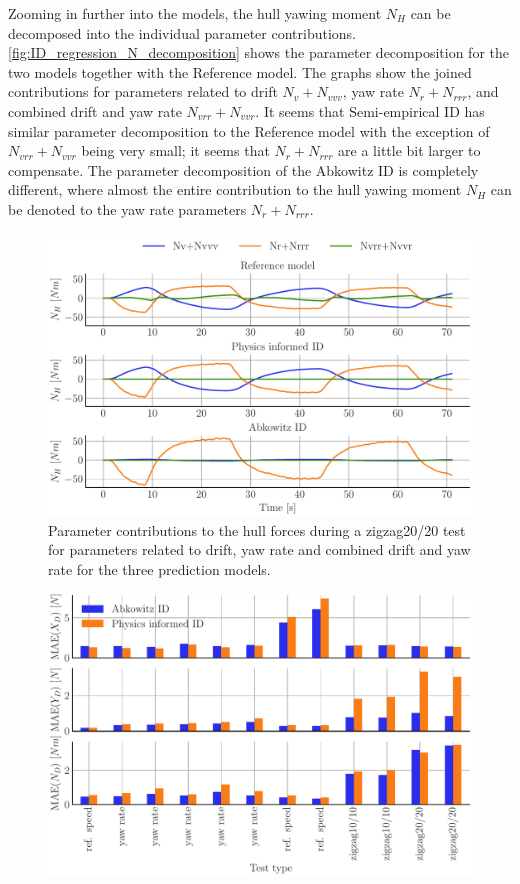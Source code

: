 Zooming in further into the models, the hull yawing moment $N_H$ can be decomposed into the individual parameter contributions. \autoref{fig:ID_regression_N_decomposition} shows the parameter decomposition for the two models together with the Reference model. The graphs show the joined contributions for parameters related to drift $N_v+N_{vvv}$, yaw rate $N_r+N_{rrr}$, and combined drift and yaw rate $N_{vrr}+N_{vvr}$. It seems that Semi-empirical ID has similar parameter decomposition to the Reference model with the exception of $N_{vrr}+N_{vvr}$ being very small; it seems that $N_r+N_{rrr}$ are a little bit larger to compensate.
The parameter decomposition of the Abkowitz ID is completely different, where almost the entire contribution to the hull yawing moment $N_H$ can be denoted to the yaw rate parameters $N_r+N_{rrr}$. 
\begin{figure}[h!]
    \begin{center}
        \includegraphics[width=\columnwidth]{figures/result_ID_regression.ID_regression_N_decomposition.pdf}
        \caption{Parameter contributions to the hull forces during a zigzag20/20 test for parameters related to drift, yaw rate and combined drift and yaw rate for the three prediction models.}
        \label{fig:ID_regression_N_decomposition}
    \end{center}
\end{figure}
%
\begin{figure}[h!]
    \begin{center}
        \includegraphics[width=\columnwidth]{figures/result_ID_regression.ID_models_mean_average_error.pdf}
        \caption{}
        \label{fig:ID_models_mean_average_error}
    \end{center}
\end{figure}
